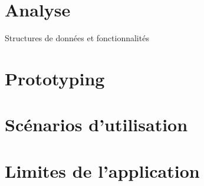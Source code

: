 \chapter{Analyse}

	Structures de données et fonctionnalités


\chapter{Prototyping}



\chapter{Scénarios d'utilisation}


	
\chapter{Limites de l'application}


